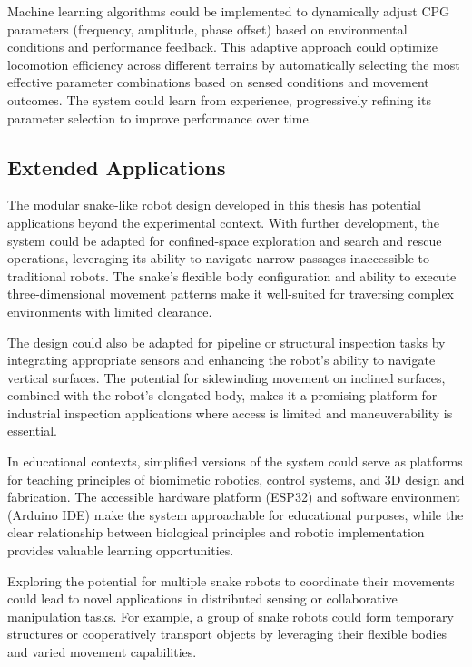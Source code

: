 \documentclass[12pt,a4paper]{report}
\begin{document}
Machine learning algorithms could be implemented to dynamically adjust CPG parameters (frequency, amplitude, phase offset) based on environmental conditions and performance feedback. This adaptive approach could optimize locomotion efficiency across different terrains by automatically selecting the most effective parameter combinations based on sensed conditions and movement outcomes. The system could learn from experience, progressively refining its parameter selection to improve performance over time.

\subsection{Extended Applications}
\label{subsec:applications}

The modular snake-like robot design developed in this thesis has potential applications beyond the experimental context. With further development, the system could be adapted for confined-space exploration and search and rescue operations, leveraging its ability to navigate narrow passages inaccessible to traditional robots. The snake's flexible body configuration and ability to execute three-dimensional movement patterns make it well-suited for traversing complex environments with limited clearance.

The design could also be adapted for pipeline or structural inspection tasks by integrating appropriate sensors and enhancing the robot's ability to navigate vertical surfaces. The potential for sidewinding movement on inclined surfaces, combined with the robot's elongated body, makes it a promising platform for industrial inspection applications where access is limited and maneuverability is essential.

In educational contexts, simplified versions of the system could serve as platforms for teaching principles of biomimetic robotics, control systems, and 3D design and fabrication. The accessible hardware platform (ESP32) and software environment (Arduino IDE) make the system approachable for educational purposes, while the clear relationship between biological principles and robotic implementation provides valuable learning opportunities.

Exploring the potential for multiple snake robots to coordinate their movements could lead to novel applications in distributed sensing or collaborative manipulation tasks. For example, a group of snake robots could form temporary structures or cooperatively transport objects by leveraging their flexible bodies and varied movement capabilities.
\end{document}
